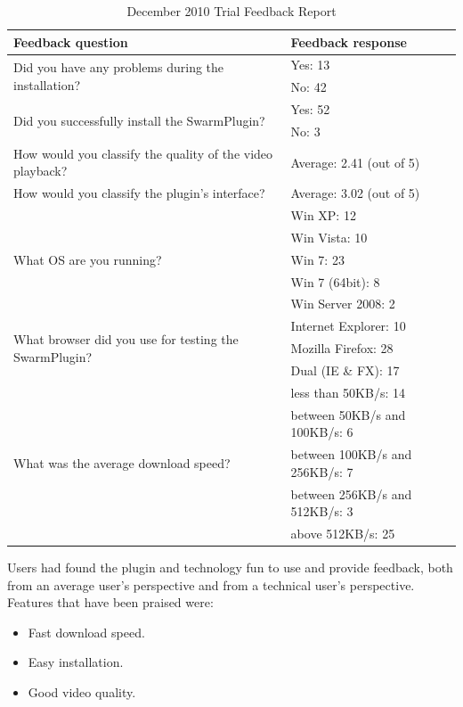 \begin{table}[htb]
  \centering
  \caption{December 2010 Trial Feedback Report}
  \label{tab:multimedia-dist:december-2010-results}
  \begin{tabular}{@{}ll@{}}
    \toprule
      \textbf{Feedback question} & \textbf{Feedback response} \\
    \midrule
      \multirow{2}{*}{Did you have any problems during the installation?} &
      Yes: 13 \\
       & No: 42 \\
    \midrule
      \multirow{2}{*}{Did you successfully install the SwarmPlugin?} & Yes: 52
      \\
       & No: 3 \\
    \midrule
      How would you classify the quality of the video playback? & Average:
      2.41 (out of 5) \\
    \midrule
      How would you classify the plugin's interface? & Average: 3.02 (out of
      5) \\
    \midrule
      \multirow{5}{*}{What OS are you running?} & Win XP: 12 \\
       & Win Vista: 10 \\
       & Win 7: 23 \\
       & Win 7 (64bit): 8 \\
       & Win Server 2008: 2 \\
    \midrule
      \multirow{3}{*}{What browser did you use for testing the SwarmPlugin?} &
      Internet Explorer: 10 \\
       & Mozilla Firefox: 28 \\
       & Dual (IE \& FX): 17 \\
    \midrule
      \multirow{5}{*}{What was the average download speed?} & less than
      50KB/s: 14 \\
       & between 50KB/s and 100KB/s: 6 \\
       & between 100KB/s and 256KB/s: 7 \\
       & between 256KB/s and 512KB/s: 3 \\
       & above 512KB/s: 25 \\
    \bottomrule
  \end{tabular}
\end{table}

Users had found the plugin and technology fun to use and provide feedback,
both from an average user's perspective and from a technical user's
perspective. Features that have been praised were:
\begin{itemize}
  \item Fast download speed.
  \item Easy installation.
  \item Good video quality.
\end{itemize}

